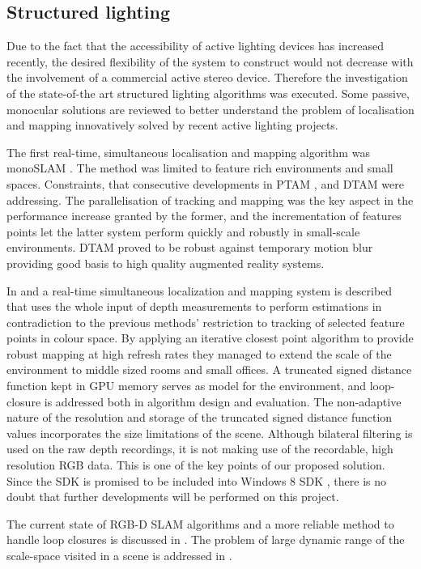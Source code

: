 \documentclass{ucl_thesis}
\begin{document}
\subsection{Structured lighting}
\label{sec:kinfu}

Due to the fact that the accessibility of active lighting devices has increased recently, the desired flexibility of the system to construct would not decrease with the involvement of a commercial active stereo device. Therefore the investigation of the state-of-the art structured lighting algorithms was executed. Some passive, monocular solutions are reviewed to better understand the problem of localisation and mapping innovatively solved by recent active lighting projects.

\par The first real-time, simultaneous localisation and mapping algorithm was monoSLAM \cite{monoslam}. The method was limited to feature rich environments and small spaces. Constraints, that consecutive developments in PTAM \cite{PTAM}, \cite{klein09cameraphone} and DTAM \cite{DTAM} were addressing. The parallelisation of tracking and mapping was the key aspect in the performance increase granted by the former, and the incrementation of features points let the latter system perform quickly and robustly in small-scale environments. DTAM proved to be robust against temporary motion blur providing good basis to high quality augmented reality systems.

\par In \cite{Izadi11} and \cite{Newcombe11} a real-time simultaneous localization and mapping system is described that uses the whole input of depth measurements to perform estimations in contradiction to the previous methods' restriction to tracking of selected feature points in colour space. By applying an iterative closest point algorithm to provide robust mapping at high refresh rates they managed to extend the scale of the environment to middle sized rooms and small offices. A truncated signed distance function kept in GPU memory serves as model for the environment, and loop-closure is addressed both in algorithm design and evaluation. The non-adaptive nature of the resolution and storage of the truncated signed distance function values incorporates the size limitations of the scene. Although bilateral filtering is used on the raw depth recordings, it is not making use of the recordable, high resolution RGB data. This is one of the key points of our proposed solution. Since the SDK is promised to be included into Windows 8 SDK \cite{SDKKinectFusion}, there is no doubt that further developments will be performed on this project. 
\par The current state of RGB-D SLAM algorithms and a more reliable method to handle loop closures is discussed in \cite{endres12icra}. The problem of large dynamic range of the scale-space visited in a scene is addressed in \cite{Fuhrmann:2011}.
\end{document}
